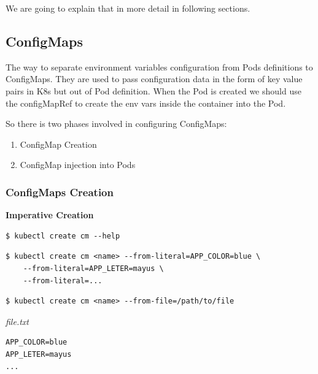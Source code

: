 \documentclass{article}
\newenvironment{codetemplate}[1][]{%
  \mybasecolorbox[#1]
  \itshape
}{%
  \endmybasecolorbox
}
\begin{document}
We are going to explain that in more detail in following sections.

\subsection{ConfigMaps}
The way to separate environment variables configuration from Pods definitions to ConfigMaps. They are used to pass configuration data in the form of key value pairs in K8s but out of Pod definition. When the Pod is created we should use the configMapRef to create the env vars inside the container into the Pod.

So there is two phases involved in configuring ConfigMaps:
\begin{enumerate}
    \item ConfigMap Creation
    \item ConfigMap injection into Pods
\end{enumerate}

\subsubsection{ConfigMaps Creation}

\textbf{Imperative Creation}
\begin{codetemplate}{}
\begin{verbatim}
$ kubectl create cm --help
\end{verbatim}
\end{codetemplate}

\begin{codetemplate}{}
\begin{verbatim}
$ kubectl create cm <name> --from-literal=APP_COLOR=blue \
    --from-literal=APP_LETER=mayus \
    --from-literal=...
\end{verbatim}
\end{codetemplate}

\begin{codetemplate}{}
\begin{verbatim}
$ kubectl create cm <name> --from-file=/path/to/file
\end{verbatim}
\end{codetemplate}

\begin{codetemplate}{file.txt}
\begin{verbatim}
APP_COLOR=blue
APP_LETER=mayus
...
\end{verbatim}
\end{codetemplate}
\end{document}
